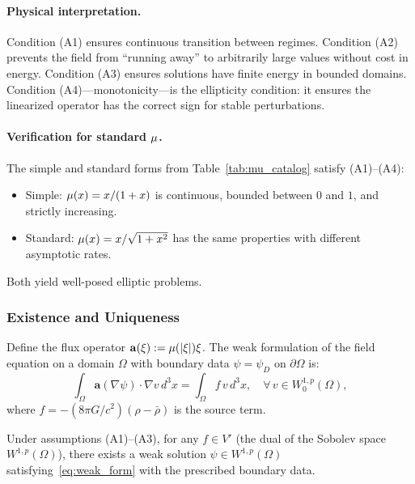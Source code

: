 \paragraph{Physical interpretation.}
Condition (A1) ensures continuous transition between regimes. 
Condition (A2) prevents the field from ``running away'' to arbitrarily 
large values without cost in energy. Condition (A3) ensures solutions 
have finite energy in bounded domains. Condition (A4)---monotonicity---is 
the ellipticity condition: it ensures the linearized operator has the 
correct sign for stable perturbations.

\paragraph{Verification for standard $\mu$.}
The simple and standard forms from Table~\ref{tab:mu_catalog} satisfy 
(A1)--(A4):
\begin{itemize}
\item Simple: $\mu(x) = x/(1+x)$ is continuous, bounded between 
$0$ and $1$, and strictly increasing.
\item Standard: $\mu(x) = x/\sqrt{1+x^2}$ has the same properties 
with different asymptotic rates.
\end{itemize}
Both yield well-posed elliptic problems.

\subsubsection{Existence and Uniqueness}

Define the flux operator $\mathbf{a}(\xi) := \mu(|\xi|)\xi$. 
The weak formulation of the field equation on a domain $\Omega$ with 
boundary data $\psi = \psi_D$ on $\partial\Omega$ is:
\begin{equation}
\int_\Omega \mathbf{a}(\nabla\psi) \cdot \nabla v\,d^3x 
= \int_\Omega f\,v\,d^3x, \quad \forall\,v \in W_0^{1,p}(\Omega),
\label{eq:weak_form}
\end{equation}
where $f = -(8\pi G/c^2)(\rho - \bar{\rho})$ is the source term.

\begin{theorem}[Existence]\label{thm:existence}
Under assumptions (A1)--(A3), for any $f \in V'$ (the dual of the Sobolev 
space $W^{1,p}(\Omega)$), there exists a weak solution 
$\psi \in W^{1,p}(\Omega)$ satisfying~\eqref{eq:weak_form} with the 
prescribed boundary data.
\end{theorem}

